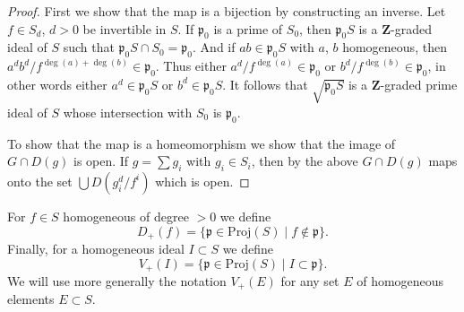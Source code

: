 \begin{proof}
First we show that the map is a bijection by constructing an inverse.
Let $f \in S_d$, $d > 0$ be invertible in $S$.
If $\mathfrak p_0$ is a prime of $S_0$, then $\mathfrak p_0S$
is a $\mathbf{Z}$-graded ideal of $S$ such that
$\mathfrak p_0S \cap S_0 = \mathfrak p_0$. And if $ab \in \mathfrak p_0S$
with $a$, $b$ homogeneous, then
$a^db^d/f^{\deg(a) + \deg(b)} \in \mathfrak p_0$.
Thus either $a^d/f^{\deg(a)} \in \mathfrak p_0$ or
$b^d/f^{\deg(b)} \in \mathfrak p_0$, in other words either
$a^d \in \mathfrak p_0S$ or $b^d \in \mathfrak p_0S$.
It follows that $\sqrt{\mathfrak p_0S}$ is a $\mathbf{Z}$-graded
prime ideal of $S$ whose intersection with $S_0$ is $\mathfrak p_0$.

\medskip\noindent
To show that the map is a homeomorphism we show that
the image of $G \cap D(g)$ is open. If $g = \sum g_i$
with $g_i \in S_i$, then by the above $G \cap D(g)$
maps onto the set $\bigcup D(g_i^d/f^i)$ which is open.
\end{proof}

\noindent
For $f \in S$ homogeneous of degree $> 0$ we define
$$
D_{+}(f) = \{ \mathfrak p \in \text{Proj}(S) \mid f \not\in \mathfrak p \}.
$$
Finally, for a homogeneous ideal $I \subset S$ we define
$$
V_{+}(I) = \{ \mathfrak p \in \text{Proj}(S) \mid I \subset \mathfrak p \}.
$$
We will use more generally the notation $V_{+}(E)$ for any
set $E$ of homogeneous elements $E \subset S$.

